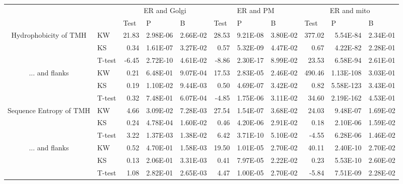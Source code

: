 \begin{table}[htbp]
    \begin{tabular}{clrrrrrrrrr}
                &       & \multicolumn{3}{c}{ER and Golgi} & \multicolumn{3}{c}{ER and PM} & \multicolumn{3}{c}{ER and mito} \\
                &       & \multicolumn{1}{l}{Test} & \multicolumn{1}{l}{P} & \multicolumn{1}{l}{B} & \multicolumn{1}{l}{Test} & \multicolumn{1}{l}{P} & \multicolumn{1}{l}{B} & \multicolumn{1}{l}{Test} & \multicolumn{1}{l}{P} & \multicolumn{1}{l}{B} \\
    \multirow{3}[0]{*}{Hydrophobicity of TMH } &  KW & 21.83 & 2.98E-06 & 2.66E-02 & 28.53 & 9.21E-08 & 3.80E-02 & 377.02 & 5.54E-84 & 2.34E-01 \\
                &  KS & 0.34  & 1.61E-07 & 3.27E-02 & 0.57  & 5.32E-09 & 4.47E-02 & 0.67  & 4.22E-82 & 2.28E-01 \\
                &  T-test & -6.45 & 2.72E-10 & 4.61E-02 & -8.86 & 2.30E-17 & 8.99E-02 & 23.53 & 6.58E-94 & 2.61E-01 \\
    \multirow{3}[0]{*}{... and flanks} &  KW & 0.21  & 6.48E-01 & 9.07E-04 & 17.53 & 2.83E-05 & 2.46E-02 & 490.46 & 1.13E-108 & 3.03E-01 \\
                &  KS & 0.19  & 1.10E-02 & 9.44E-03 & 0.50  & 4.69E-07 & 3.42E-02 & 0.82  & 5.58E-123 & 3.43E-01 \\
                &  T-test & 0.32  & 7.48E-01 & 6.07E-04 & -4.85 & 1.75E-06 & 3.11E-02 & 34.60 & 2.19E-162 & 4.53E-01 \\
    \multirow{3}[0]{*}{Sequence Entropy of TMH } &  KW & 4.66  & 3.09E-02 & 7.28E-03 & 27.54 & 1.54E-07 & 3.68E-02 & 24.03 & 9.48E-07 & 1.69E-02 \\
                &  KS & 0.24  & 4.78E-04 & 1.60E-02 & 0.46  & 4.20E-06 & 2.91E-02 & 0.18  & 2.10E-06 & 1.59E-02 \\
                &  T-test & 3.22  & 1.37E-03 & 1.38E-02 & 6.42  & 3.71E-10 & 5.10E-02 & -4.55 & 6.28E-06 & 1.46E-02 \\
    \multirow{3}[0]{*}{... and flanks} &  KW & 0.52  & 4.70E-01 & 1.58E-03 & 19.50 & 1.01E-05 & 2.70E-02 & 40.11 & 2.40E-10 & 2.70E-02 \\
                &  KS & 0.13  & 2.06E-01 & 3.31E-03 & 0.41  & 7.97E-05 & 2.22E-02 & 0.23  & 5.53E-10 & 2.60E-02 \\
                &  T-test & 1.08  & 2.82E-01 & 2.65E-03 & 4.47  & 1.00E-05 & 2.70E-02 & -5.84 & 7.51E-09 & 2.28E-02 \\
    \end{tabular}%
                    \label{table:organellesuniprotstats}
    \end{table}%

